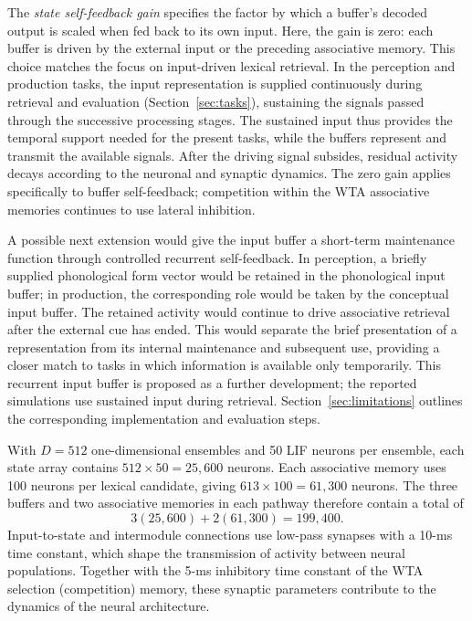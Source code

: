 The \emph{state self-feedback gain} specifies the factor by which a buffer's decoded output is scaled when fed back to its own input. Here, the gain is zero: each buffer is driven by the external input or the preceding associative memory. This choice matches the focus on input-driven lexical retrieval. In the perception and production tasks, the input representation is supplied continuously during retrieval and evaluation (Section~\ref{sec:tasks}), sustaining the signals passed through the successive processing stages. The sustained input thus provides the temporal support needed for the present tasks, while the buffers represent and transmit the available signals. After the driving signal subsides, residual activity decays according to the neuronal and synaptic dynamics. The zero gain applies specifically to buffer self-feedback; competition within the WTA associative memories continues to use lateral inhibition.

A possible next extension would give the input buffer a short-term maintenance function through controlled recurrent self-feedback. In perception, a briefly supplied phonological form vector would be retained in the phonological input buffer; in production, the corresponding role would be taken by the conceptual input buffer. The retained activity would continue to drive associative retrieval after the external cue has ended. This would separate the brief presentation of a representation from its internal maintenance and subsequent use, providing a closer match to tasks in which information is available only temporarily. This recurrent input buffer is proposed as a further development; the reported simulations use sustained input during retrieval. Section~\ref{sec:limitations} outlines the corresponding implementation and evaluation steps.

With $D=512$ one-dimensional ensembles and 50 LIF neurons per ensemble, each state array contains $512\times50=25{,}600$ neurons. Each associative memory uses 100 neurons per lexical candidate, giving $613\times100=61{,}300$ neurons. The three buffers and two associative memories in each pathway therefore contain a total of
\begin{equation}
 3(25{,}600)+2(61{,}300)=199{,}400.
\end{equation}
Input-to-state and intermodule connections use low-pass synapses with a 10-ms time constant, which shape the transmission of activity between neural populations. Together with the 5-ms inhibitory time constant of the WTA selection (competition) memory, these synaptic parameters contribute to the dynamics of the neural architecture.

